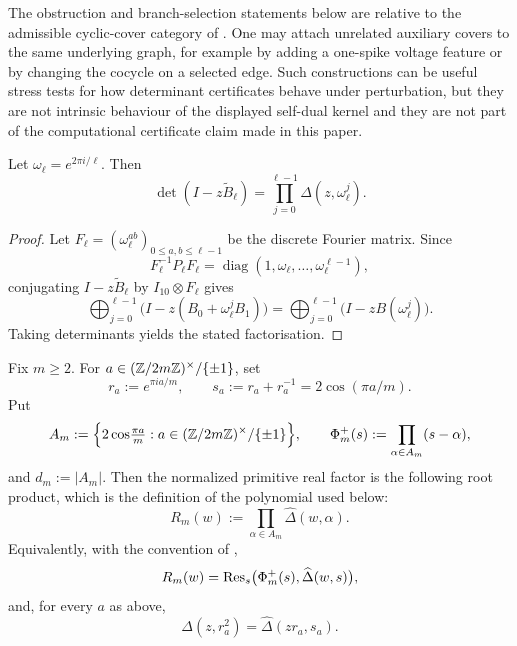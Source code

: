 \begin{remark}
  \label{rem:cover-scope}
  The obstruction and branch-selection statements below are relative to
  the admissible cyclic-cover category of
  .  One may attach unrelated
  auxiliary covers to the same underlying graph, for example by adding
  a one-spike voltage feature or by changing the cocycle on a selected
  edge.  Such constructions can be useful stress tests for how
  determinant certificates behave under perturbation, but they are not
  intrinsic behaviour of the displayed self-dual kernel and they are
  not part of the computational certificate claim made in this paper.
\end{remark}

\begin{proposition}
  \label{prop:sync-cyclic-lift-factorisation}
  Let \(\omega_\ell=e^{2\pi i/\ell}\). Then
  \[
    \det(I-z\widetilde B_\ell)
    =\prod_{j=0}^{\ell-1}\Delta(z,\omega_\ell^j).
  \]
\end{proposition}

\begin{proof}
Let \(F_\ell=(\omega_\ell^{ab})_{0\le a,b\le \ell-1}\) be the discrete Fourier
matrix. Since
\[
  F_\ell^{-1}P_\ell F_\ell
    =\operatorname{diag}(1,\omega_\ell,\dots,\omega_\ell^{\ell-1}),
\]
conjugating \(I-z\widetilde B_\ell\) by \(I_{10}\otimes F_\ell\) gives
\[
  \bigoplus_{j=0}^{\ell-1}\bigl(I-z(B_0+\omega_\ell^jB_1)\bigr)
  =\bigoplus_{j=0}^{\ell-1}\bigl(I-zB(\omega_\ell^j)\bigr).
\]
Taking determinants yields the stated factorisation.
\end{proof}

\begin{proposition}
  \label{prop:sync-primitive-real-factor}
  Fix \(m\ge 2\). For
  \(a\in(\mathbb{Z}/2m\mathbb{Z})^\times/\{\pm1\}\), set
  \[
    r_a:=e^{\pi ia/m},
    \qquad
    s_a:=r_a+r_a^{-1}=2\cos(\pi a/m).
  \]
  Put
  \[
    A_m:=\Bigl\{2\cos\!\tfrac{\pi a}{m}:
      a\in(\mathbb{Z}/2m\mathbb{Z})^\times/\{\pm1\}\Bigr\},
    \qquad
    \Phi_m^+(s):=\prod_{\alpha\in A_m}(s-\alpha),
  \]
  and \(d_m:=|A_m|\).
  Then the normalized primitive real factor is the following root
  product, which is the definition of the polynomial used below:
  \[
    R_m(w):=\prod_{\alpha\in A_m}\widehat\Delta(w,\alpha).
  \]
  Equivalently, with the convention of
  ,
  \[
    R_m(w)=
    \operatorname{Res}_s\bigl(\Phi_m^+(s),\widehat\Delta(w,s)\bigr),
  \]
  and, for every \(a\) as above,
  \[
    \Delta(z,r_a^2)=\widehat\Delta(zr_a,s_a).
  \]
\end{proposition}


